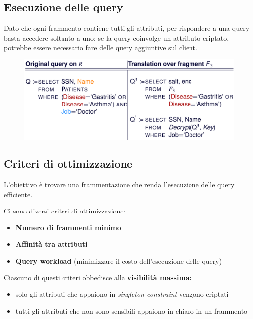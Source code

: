 \documentclass{report}
\begin{document}
\newpage
\subsection{Esecuzione delle query}
Dato che ogni frammento contiene tutti gli attributi, per rispondere a una query 
basta accedere soltanto a uno; se la query coinvolge un attributo criptato, 
potrebbe essere necessario fare delle query aggiuntive sul client.

\begin{figure}[ht]
    \centering
    \includegraphics[width=1\linewidth]{images/encryption-fragmentation/multi-frag-query.png}
\end{figure}

\newpage
\subsection{Criteri di ottimizzazione}
L'obiettivo è trovare una frammentazione che renda l'esecuzione delle query efficiente.

\noindent Ci sono diversi criteri di ottimizzazione:
\begin{itemize}
    \item \textbf{Numero di frammenti minimo}
    \item \textbf{Affinità tra attributi}
    \item \textbf{Query workload} (minimizzare il costo dell'esecuzione delle query)
\end{itemize}

\noindent Ciascuno di questi criteri obbedisce alla \textbf{visibilità massima:}
\begin{itemize}
    \item solo gli attributi che appaiono in \textit{singleton constraint} vengono criptati 
    \item tutti gli attributi che non sono sensibili appaiono in chiaro in un frammento
\end{itemize}
\end{document}
